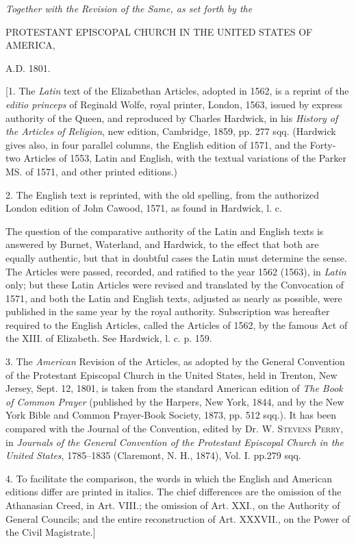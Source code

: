 
\emph{Together with the Revision of the Same, as set forth by the}

PROTESTANT EPISCOPAL CHURCH IN THE UNITED STATES OF AMERICA,

A.D. 1801.

[1. The \emph{Latin} text of the Elizabethan Articles, adopted in 1562, is a reprint of the \emph{editio princeps} of Reginald Wolfe, royal printer, London, 1563, issued by express authority of the Queen, and reproduced by Charles Hardwick, in his \emph{History of the Articles of Religion}, new edition, Cambridge, 1859, pp. 277 sqq. (Hardwick gives also, in four parallel columns, the English edition of 1571, and the Forty-two Articles of 1553, Latin and English, with the textual variations of the Parker MS. of 1571, and other printed editions.)

2. The English text is reprinted, with the old spelling, from the authorized London edition of John Cawood, 1571, as found in Hardwick, l. c.

The question of the comparative authority of the Latin and English texts is answered by Burnet, Waterland, and Hardwick, to the effect that both are equally authentic, but that in doubtful cases the Latin must determine the sense. The Articles were passed, recorded, and ratified to the year 1562 (1563), in \emph{Latin} only; but these Latin Articles were revised and translated by the Convocation of 1571, and both the Latin and English texts, adjusted as nearly as possible, were published in the same year by the royal authority. Subscription was hereafter required to the English Articles, called the Articles of 1562, by the famous Act of the XIII. of Elizabeth. See Hardwick, l. c. p. 159.

3. The \emph{American} Revision of the Articles, as adopted by the General Convention of the Protestant Episcopal Church in the United States, held in Trenton, New Jersey, Sept. 12, 1801, is taken from the standard American edition of \emph{The Book of Common Prayer} (published by the Harpers, New York, 1844, and by the New York Bible and Common Prayer-Book Society, 1873, pp. 512 sqq.). It has been compared with the Journal of the Convention, edited by Dr. W. S\textsc{tevens} P\textsc{erry}, in \emph{Journals of the General Convention of the Protestant Episcopal Church in the United States}, 1785–1835 (Claremont, N. H., 1874), Vol. I. pp.279 sqq.

4. To facilitate the comparison, the words in which the English and American editions differ are printed in italics. The chief differences are the omission of the Athanasian Creed, in Art. VIII.; the omission of Art. XXI., on the Authority of General Councils; and the entire reconstruction of Art. XXXVII., on the Power of the Civil Magistrate.]

